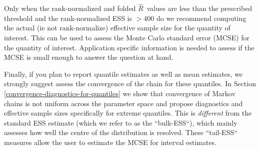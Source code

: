 \documentclass[american,]{article}
\newcommand{\Rhat}{$\widehat{R}$}
\begin{document}
Only when the rank-normalized and folded \Rhat\ values are less than the
prescribed threshold and the rank-normalized ESS is $>400$ do we recommend
computing the actual (ie not rank-normalize) effective sample size for the 
quantity of interest. This can be used to assess the Monte Carlo standard
error (MCSE) for the quantity of interest. Application specific information is needed to 
assess if the MCSE is small enough to answer the question at hand.

Finally, if you plan to report quantile estimates as well as mean estimates, we 
strongly suggest assess the convergence of the chain for these quantiles.
In Section \ref{convergence-diagnostics-for-quantiles} we show that
convergence of Markov chains is not uniform across the parameter space
and propose diagnostics and effective sample sizes specifically for extreme 
quantiles. This is \emph{different} from the standard ESS estimate (which 
we refer to as the ``bulk-ESS``), which mainly assesses how well
the centre of the distribution is resolved. These ``tail-ESS`` measures
allow the user to estimate the MCSE for interval estimates.
\end{document}
